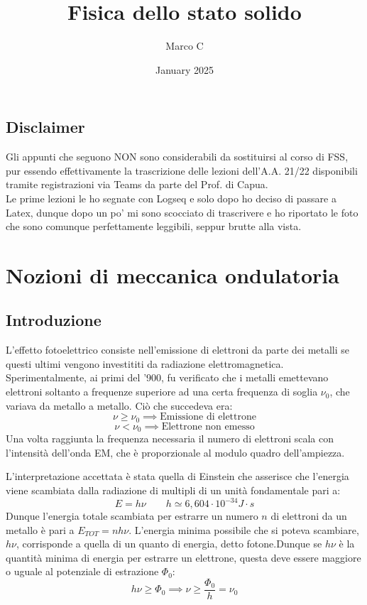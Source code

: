 \documentclass{book}
\title{Fisica dello stato solido}
\author{Marco C}
\date{January 2025}
\begin{document}
\maketitle
\tableofcontents
\section*{Disclaimer}
    Gli appunti che seguono NON sono considerabili da sostituirsi al corso di FSS, pur essendo effettivamente la trascrizione delle lezioni dell'A.A. 21/22 disponibili tramite registrazioni via Teams da parte del Prof. di Capua.\\
    Le prime lezioni le ho segnate con Logseq e solo dopo ho deciso di passare a Latex, dunque dopo un po' mi sono scocciato di trascrivere e ho riportato le foto che sono comunque perfettamente leggibili, seppur brutte alla vista.
\chapter{Nozioni di meccanica ondulatoria}
    \section{Introduzione}
        L'effetto fotoelettrico consiste nell'emissione di elettroni da parte dei metalli se questi ultimi vengono investititi da radiazione elettromagnetica. Sperimentalmente, ai primi del '900, fu verificato che i metalli emettevano elettroni soltanto a frequenze superiore ad una certa frequenza di soglia $\nu_{0}$, che variava da metallo a metallo. Ciò che succedeva era:
        $$\nu \geq \nu_{0} \implies \textrm{Emissione di elettrone}$$
        $$\nu < \nu_{0} \implies \textrm{Elettrone non emesso}$$
        Una volta raggiunta la frequenza necessaria il numero di elettroni scala con l'intensità dell'onda EM, che è proporzionale al modulo quadro dell'ampiezza.

        L'interpretazione accettata è stata quella di Einstein che asserisce che l'energia viene scambiata dalla radiazione di multipli di un unità fondamentale pari a:
        $$E = h \nu \qquad h \simeq 6,604 \cdot 10^{-34} J \cdot s$$
        Dunque l'energia totale scambiata per estrarre un numero $n$ di elettroni da un metallo è pari a $E_{TOT} = n h \nu$.  L'energia minima possibile che si poteva scambiare, $h \nu$, corrisponde a quella di un quanto di energia, detto fotone.Dunque se $h \nu$ è la quantità minima di energia per estrarre un elettrone, questa deve essere maggiore o uguale al potenziale di estrazione $\Phi_{0}$:
        $$h \nu \geq \Phi_{0} \implies \nu \geq \frac{\Phi_{0}}{h} = \nu_{0}$$
\end{document}
